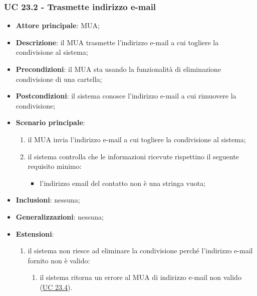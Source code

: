     \subsubsection{UC 23.2 - Trasmette indirizzo e-mail} \label{sec:UC23.2}
    \begin{itemize}
        \item \textbf{Attore principale}: MUA;
        \item \textbf{Descrizione}: il MUA trasmette l'indirizzo e-mail a cui togliere la condivisione al sistema;
        \item \textbf{Precondizioni}: il MUA sta usando la funzionalità di eliminazione condivisione di una cartella;
        \item \textbf{Postcondizioni}: il sistema conosce l'indirizzo e-mail a cui rimuovere la condivisione;
        \item \textbf{Scenario principale}:
            \begin{enumerate}
                \item il MUA invia l'indirizzo e-mail a cui togliere la condivisione al sistema;
                \item il sistema controlla che le informazioni ricevute rispettino il seguente requisito minimo:
                    \begin{itemize}
                        \item l'indirizzo email del contatto non è una stringa vuota;
                    \end{itemize}
            \end{enumerate}
        \item \textbf{Inclusioni}: nessuna;
        \item \textbf{Generalizzazioni}: nessuna;
        \item \textbf{Estensioni}:
            \begin{enumerate}[label=\alph*.]
                \item il sistema non riesce ad eliminare la condivisione perché l'indirizzo e-mail fornito non è valido:
                \begin{enumerate}[label=\arabic*.]
                    \item il sistema ritorna un errore al MUA di indirizzo e-mail non valido (\hyperref[sec:UC23.4]{UC 23.4}).
                \end{enumerate}
            \end{enumerate}
    \end{itemize}


